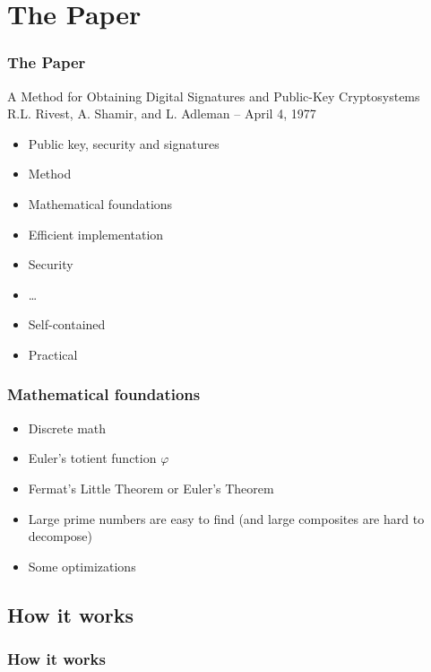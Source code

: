 \documentclass{beamer}
\begin{document}
\section{The Paper}

\begin{frame}
	\frametitle{The Paper}
		A Method for Obtaining Digital Signatures and Public-Key Cryptosystems \\
		R.L. Rivest, A. Shamir, and L. Adleman -- April 4, 1977
		\begin{itemize}
			\item Public key, security and signatures
			\item Method
			\item Mathematical foundations
			\item Efficient implementation
			\item Security
			\item \ldots
			\item Self-contained
			\item Practical
		\end{itemize}
\end{frame}

\begin{frame}
	\frametitle{Mathematical foundations}
	\begin{itemize}
		\item Discrete math
		\item Euler's totient function $\varphi$
		\item Fermat's Little Theorem or Euler's Theorem
		\item Large prime numbers are easy to find (and large
		      composites are hard to decompose)
		\item Some optimizations
	\end{itemize}
\end{frame}

\subsection{How it works}

\begin{frame}
	\frametitle{How it works}
\end{frame}
\end{document}
